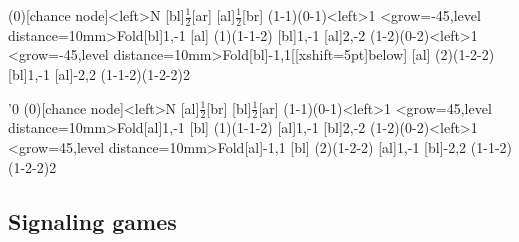 \begin{tcblisting}{}
\begin{istgame}[scale=1.3]
\xtdistance{15mm}{30mm}
\istroot(0)[chance node]<left>{N}
  [bl]{$\frac12$}[ar]
  [al]{$ \frac12$}[br]
  \endist
\xtdistance{15mm}{30mm}
\istroot(1-1)(0-1)<left>{1}
  \istb<grow=-45,level distance=10mm>{Fold}[bl]{1,-1}
  [al]
  \endist
\xtdistance{12mm}{24mm}
\istroot(1)(1-1-2)
  [bl]{1,-1}
  [al]{2,-2}
  \endist
\xtdistance{15mm}{30mm}
\istroot(1-2)(0-2)<left>{1}
  \istb<grow=-45,level distance=10mm>{Fold}[bl]{-1,1}[[xshift=5pt]below]
  [al]
  \endist
\xtdistance{12mm}{24mm}
\istroot(2)(1-2-2)
  [bl]{1,-1}
  [al]{-2,2}
  \endist
\xtCInfosetO[fill=blue!20](1-1-2)(1-2-2){2}
\end{istgame}
\end{tcblisting}

\begin{tcblisting}{}
\begin{istgame}[scale=1.3]
\setistgrowdirection'{0}   %
\xtdistance{15mm}{30mm}
\istroot(0)[chance node]<left>{N}
  [al]{$\frac12$}[br]
  [bl]{$\frac12$}[ar]
  \endist
\xtdistance{15mm}{30mm}
\istroot(1-1)(0-1)<left>{1}
  \istb<grow=45,level distance=10mm>{Fold}[al]{1,-1}
  [bl]
  \endist
\xtdistance{12mm}{24mm}
\istroot(1)(1-1-2)
  [al]{1,-1}
  [bl]{2,-2}
  \endist
\xtdistance{15mm}{30mm}
\istroot(1-2)(0-2)<left>{1}
  \istb<grow=45,level distance=10mm>{Fold}[al]{-1,1}
  [bl]
  \endist
\xtdistance{12mm}{24mm}
\istroot(2)(1-2-2)
  [al]{1,-1}
  [bl]{-2,2}
  \endist
\xtInfosetO[fill=red!20](1-1-2)(1-2-2){2}
\end{istgame}
\end{tcblisting}

\subsection{Signaling games}

